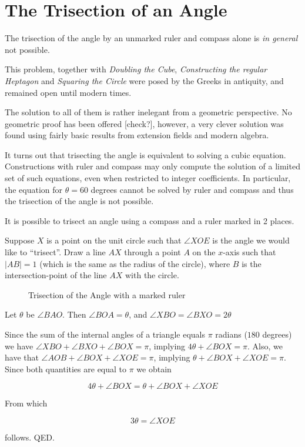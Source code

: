 \section{The Trisection of an Angle}

\begin{teo}
The trisection of the angle by an unmarked ruler and compass alone
is {\em in general} not possible.
\end{teo}


This problem, together with {\em Doubling the Cube}, {\em Constructing the
regular Heptagon} and {\em Squaring the Circle} were posed by the Greeks in
antiquity, and remained open until modern times.

The solution to all of them is rather inelegant from a geometric
perspective. No geometric proof has been offered [check?],
however, a very clever solution was found using fairly basic
results from extension fields and modern algebra.

It turns out that trisecting the angle is equivalent to solving
a cubic equation. Constructions with ruler and compass may
only compute the solution of a limited set of such equations,
even when restricted to integer coefficients. In particular,
the equation for $\theta = 60$ degrees cannot be solved by
ruler and compass and thus the trisection of the angle is not
possible.

It is possible to trisect an angle using a compass and a ruler marked
in 2 places.

Suppose $X$ is a point on the unit circle such that $\angle XOE$ is
the angle we would like to ``trisect''. Draw a line $AX$ through a
point $A$ on the $x$-axis such that $|AB| = 1$ (which is the same as
the radius of the circle), where $B$ is the intersection-point of the
line $AX$ with the circle.

\begin{figure}
\centerline{  }
\caption{Trisection of the Angle with a marked ruler}
\end{figure}



Let $\theta$ be $\angle BAO$.
Then $\angle BOA = \theta$, and $\angle XBO = \angle BXO= 2\theta$

Since the sum of the internal angles of a triangle equals $\pi$
radians ($180$ degrees) we have $ \angle XBO + \angle BXO + \angle BOX
= \pi$, implying $4 \theta + \angle BOX = \pi$.  Also, we have that
$\angle AOB + \angle BOX + \angle XOE = \pi$, implying $\theta +\angle
BOX + \angle XOE = \pi$. Since both quantities are equal to $\pi$
we obtain

\[ 4 \theta + \angle BOX = \theta +\angle BOX + \angle XOE \]

From which

\[ 3 \theta = \angle XOE \]

follows. QED.


